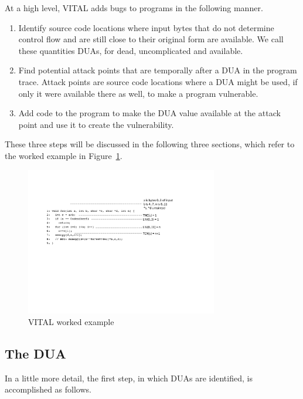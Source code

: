 
At a high level, VITAL adds bugs to programs in the following manner.

\begin {enumerate}
\item Identify source code locations where input bytes that do not determine control flow and are still close to their original form are available. 
We call these quantities DUAs, for dead, uncomplicated and available. 
\item Find potential attack points that are temporally after a DUA in the program trace.
Attack points are source code locations where a DUA might be used, if only it were available there as well, to make a program vulnerable. 
\item Add code to the program to make the DUA value available at the attack point and use it to create the vulnerability. 
\end{enumerate}

These three steps will be discussed in the following three sections, which refer to the worked example in Figure~\ref{fig:worked-example}.


\begin{figure} 
\centering
\includegraphics[width=3.3in]{worked-example.pdf}
\caption{
VITAL worked example
}
\label{fig:worked-example}
\end{figure}



\subsection {The DUA}

In a little more detail, the first step, in which DUAs are identified, is accomplished as follows.  

